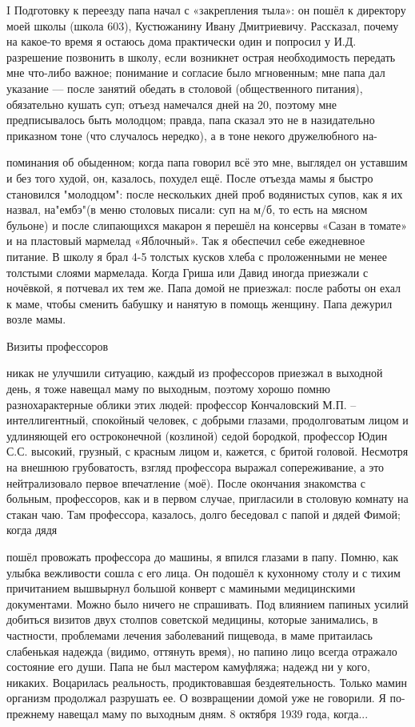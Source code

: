 
\label{187-1}
I Подготовку к переезду папа начал с «закрепления тыла»: он пошёл к директору моей школы (школа 603), Кустюжанину Ивану Дмитриевичу. Рассказал, почему на какое-то время я остаюсь дома практически один и попросил у И.Д. разрешение позвонить в школу, если возникнет острая необходимость передать мне что-либо важное; понимание и согласие было мгновенным; мне папа дал указание — после занятий обедать в столовой (общественного питания), обязательно кушать суп; отъезд намечался дней на 20, поэтому мне предписывалось быть молодцом; правда, папа сказал это не в назидательно приказном тоне (что случалось нередко), а в тоне некого дружелюбного на-

\label{188-1}
поминания об обыденном; когда папа говорил всё это мне, выглядел он уставшим и без того худой, он, казалось, похудел ещё. После отъезда мамы я быстро становился "молодцом": после нескольких дней проб водянистых супов, как я их назвал, на"ембэ"(в меню столовых писали: суп на м/б, то есть на мясном бульоне) и после слипающихся макарон я перешёл на консервы «Сазан в томате» и на пластовый мармелад «Яблочный». Так я обеспечил себе ежедневное питание. В школу я брал 4-5 толстых кусков хлеба с проложенными не менее толстыми слоями мармелада. Когда Гриша или Давид иногда приезжали с ночёвкой, я потчевал их тем же. Папа домой не приезжал: после работы он ехал к маме, чтобы сменить бабушку и нанятую в помощь женщину. Папа дежурил возле мамы.

Визиты профессоров

\label{189-1}
никак не улучшили ситуацию, каждый из профессоров приезжал в выходной день, я тоже навещал маму по выходным, поэтому хорошо помню разнохарактерные облики этих людей: профессор Кончаловский М.П. – интеллигентный, спокойный человек, с добрыми глазами, продолговатым лицом и удлиняющей его остроконечной (козлиной) седой бородкой, профессор Юдин С.С. высокий, грузный, с красным лицом и, кажется, с бритой головой. Несмотря на внешнюю грубоватость, взгляд профессора выражал сопереживание, а это нейтрализовало первое впечатление (моё). После окончания знакомства с больным, профессоров, как и в первом случае, пригласили в столовую комнату на стакан чаю. Там профессора, казалось, долго беседовал с папой и дядей Фимой; когда дядя

\label{190-1}
пошёл провожать профессора до машины, я впился глазами в папу. Помню, как улыбка вежливости сошла с его лица. Он подошёл к кухонному столу и с тихим причитанием вышвырнул большой конверт с мамиными медицинскими документами. Можно было ничего не спрашивать. Под влиянием папиных усилий добиться визитов двух столпов советской медицины, которые занимались, в частности, проблемами лечения заболеваний пищевода, в маме притаилась слабенькая надежда (видимо, оттянуть время), но папино лицо всегда отражало состояние его души. Папа не был мастером камуфляжа; надежд ни у кого, никаких. Воцарилась реальность, продиктовавшая бездеятельность. Только мамин организм продолжал разрушать ее. О возвращении домой уже не говорили. Я по-прежнему навещал маму по выходным дням. 8 октября 1939 года, когда...

